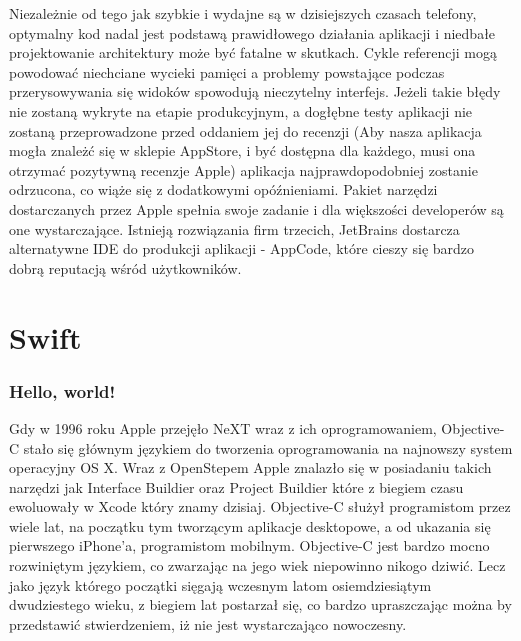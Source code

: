 Niezależnie od tego jak szybkie i wydajne są w dzisiejszych czasach telefony, optymalny kod nadal jest podstawą prawidłowego działania
aplikacji i niedbałe projektowanie architektury może być fatalne w skutkach. Cykle referencji mogą powodować niechciane wycieki pamięci
a problemy powstające podczas przerysowywania się widoków spowodują nieczytelny interfejs. Jeżeli takie błędy nie zostaną wykryte na
etapie produkcyjnym, a dogłębne testy aplikacji nie zostaną przeprowadzone przed oddaniem jej do recenzji (Aby nasza aplikacja mogła
znależć się w sklepie AppStore, i być dostępna dla każdego, musi ona otrzymać pozytywną recenzje Apple) aplikacja najprawdopodobniej
zostanie odrzucona, co wiąże się z dodatkowymi opóźnieniami. Pakiet narzędzi dostarczanych przez Apple spełnia swoje zadanie i dla
większości developerów są one wystarczające. Istnieją rozwiązania firm trzecich, JetBrains dostarcza alternatywne IDE do produkcji
aplikacji - AppCode, które cieszy się bardzo dobrą reputacją wśród użytkowników.

\section{Swift}

\subsubsection*{Hello, world!}

Gdy w 1996 roku Apple przejęło NeXT wraz z ich oprogramowaniem, Objective-C stało się głównym językiem do tworzenia oprogramowania
na najnowszy system operacyjny OS X. Wraz z OpenStepem Apple znalazło się w posiadaniu takich narzędzi jak Interface Buildier oraz
Project Buildier które z biegiem czasu ewoluowały w Xcode który znamy dzisiaj. Objective-C służył programistom przez wiele lat, na
początku tym tworzącym aplikacje desktopowe, a od ukazania się pierwszego iPhone'a, programistom mobilnym. Objective-C jest bardzo
mocno rozwiniętym językiem, co zwarzając na jego wiek niepowinno nikogo dziwić. Lecz jako język którego początki sięgają wczesnym
latom osiemdziesiątym dwudziestego wieku, z biegiem lat postarzał się, co bardzo upraszczając można by przedstawić stwierdzeniem,
iż nie jest wystarczająco nowoczesny.

